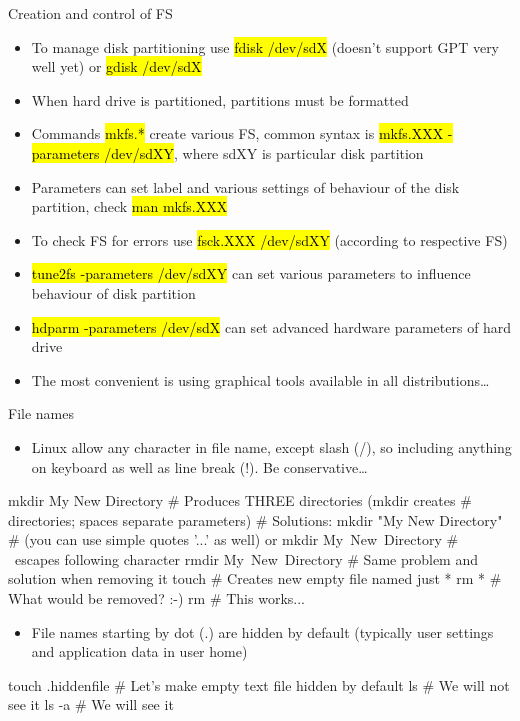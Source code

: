 \documentclass[compress, ucs, xelatex, 11pt, xcolor=svgnames,
  hyperref={
    bookmarks=true,
    unicode=true,
    colorlinks=true,
    pdftitle={Linux, command line and MetaCentrum},
    plainpages=false,
    pdfauthor={Vojtech Zeisek},
    pdfsubject={Course about use of Linux command line, writing shell scripts and using MetaCentrum of CESNET},
    pdfcreator={XeLaTeX, http://www.xelatex.org/},
    pdfkeywords={Linux, GNU, BASH, shell, command line, MetaCentrum},
    linkcolor=Sienna,
    anchorcolor=black,
    citecolor=green,
    filecolor=magenta,
    menucolor=Sienna,
    urlcolor=cyan,
    pdftex},
  url={hyphens, lowtilde} %
  ]{beamer}
\renewcommand{\texttt}[1]{\hl{\ttfamily #1}}
\begin{document}
\begin{frame}{Creation and control of FS}
\begin{itemize}
  \item To manage disk partitioning use \texttt{fdisk /dev/sdX} (doesn't support GPT very well yet) or \texttt{gdisk /dev/sdX}
  \item When hard drive is partitioned, partitions must be formatted
  \item Commands \texttt{mkfs.*} create various FS, common syntax is \texttt{mkfs.XXX -parameters /dev/sdXY}, where sdXY is particular disk partition
  \item Parameters can set label and various settings of behaviour of the disk partition, check \texttt{man mkfs.XXX}
  \item To check FS for errors use \texttt{fsck.XXX /dev/sdXY} (according to respective FS)
  \item \texttt{tune2fs -parameters /dev/sdXY} can set various parameters to influence behaviour of disk partition
  \item \texttt{hdparm -parameters /dev/sdX} can set advanced hardware parameters of hard drive
  \item The most convenient is using graphical tools available in all distributions\ldots
\end{itemize}
\end{frame}

\begin{frame}[fragile]{File names}
\begin{itemize}
  \item Linux allow \alert{any} character in file name, except \alert{slash} (\alert{/}), so including anything on keyboard as well as line break (!). Be conservative\ldots
\end{itemize}
  \begin{bashcode}
    mkdir My New Directory # Produces THREE directories (mkdir creates
                           # directories; spaces separate parameters)
                           # Solutions:
    mkdir "My New Directory" # (you can use simple quotes '...' as well) or
    mkdir My\ New\ Directory # \ escapes following character
    rmdir My\ New\ Directory # Same problem and solution when removing it
    touch \* # Creates new empty file named just *
    rm * # What would be removed? :-)
    rm \* # This works...
  \end{bashcode}
\begin{itemize}
  \item File names starting by \alert{dot} (\alert{.}) are hidden by default (typically user settings and application data in user home)
\end{itemize}
  \begin{bashcode}
    touch .hiddenfile # Let's make empty text file hidden by default
    ls # We will not see it
    ls -a # We will see it
  \end{bashcode}
\end{frame}
\end{document}
